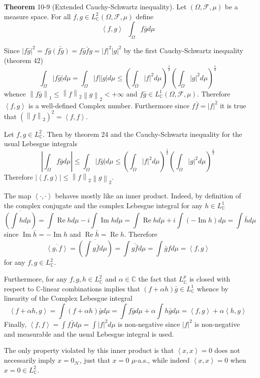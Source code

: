 \documentclass[a4paper]{article}
\newcommand{\brac}[1]{\left ( #1 \right )}
\newcommand{\abs}[1]{\left | #1 \right |}
\newcommand{\nrm}[1]{\left\| #1 \right \|}
\newcommand{\brkt}[1]{\left\langle #1 \right\rangle}
\newcommand{\Cplx}{\mathbb{C}}
\newcommand{\Hcal}{\mathcal{H}}
\newcommand{\Fcal}{\mathcal{F}}
\newcommand{\defn}{\mathop{\overset{\Delta}{=}}\nolimits}
\newcommand{\re}{\operatorname{Re}\nolimits}
\newcommand{\im}{\operatorname{Im}\nolimits}
\begin{document}
\label{thm:cauchy_schwartz_X} \noindent \textbf{Theorem} 10-9 (Extended Cauchy-Schwartz inequality).
Let $\brac{\Omega, \Fcal, \mu}$ be a measure space. For all $f,g\in L^2_\Cplx\brac{\Omega, \Fcal, \mu}$ define \[\brkt{f,g} \defn \int_\Omega f\bar{g} d\mu\]

Since $\abs{f\bar{g}}^2 = f\bar{g}\bar{\brac{f\bar{g}}} = f\bar{g} \bar{f} g = \abs{f}^2 \abs{g}^2$ by the first Cauchy-Schwartz inequality (theorem 42) \[\int_\Omega \abs{f\bar{g}} d\mu = \int_\Omega \abs{f}\abs{g} d\mu\leq \brac{\int_\Omega \abs{f}^2 d\mu}^\frac{1}{2} \brac{\int_\Omega \abs{g}^2 d\mu}^\frac{1}{2} \] whence $\nrm{f\bar{g}}_1\leq \nrm{f}_2 \nrm{g}_2 < +\infty$ and $f\bar{g}\in L^1_\Cplx\brac{\Omega, \Fcal, \mu}$. Therefore $\brkt{f,g}$ is a well-defined Complex number. Furthermore since $f\bar{f}=\abs{f}^2$ it is true that $\brac{\nrm{f}_2}^2 = \brkt{f,f}$.

Let $f,g\in L^2_\Cplx$. Then by theorem 24 and the Cauchy-Schwartz inequality for the usual Lebesgue integrals \[\abs{\int_\Omega f\bar{g} d\mu} \leq \int_\Omega \abs{f\bar{g}}d\mu\leq \brac{\int_\Omega \abs{f}^2 d\mu}^\frac{1}{2} \brac{\int_\Omega \abs{g}^2 d\mu}^\frac{1}{2}\] Therefore $\abs{\brkt{f,g}}\leq \nrm{f}_2 \nrm{g}_2$.

The map $\brkt{\cdot, \cdot}$ behaves mostly like an inner product. Indeed, by definition of the complex conjugate and the complex Lebesgue integral for any $h\in L^1_\Cplx$ \[\overline{\brac{\int h d\mu}} = \int \re h d\mu - i \int \im h d\mu = \int \re h d\mu + i \int \brac{-\im h} d\mu = \int \bar{h} d\mu\] since $\im \bar{h} = -\im h$ and $\re \bar{h} = \re h$. Therefore \[\overline{\brkt{g,f}} = \overline{\brac{\int g\bar{f} d\mu}} = \int \overline{g\bar{f}} d\mu = \int \bar{g}f d\mu = \brkt{f,g}\] for any $f,g\in L^2_\Cplx$.

Furthermore, for any $f,g,h\in L^2_\Cplx$ and $\alpha\in \Cplx$ the fact that $L^p_\Cplx$ is closed with respect to $\Cplx$-linear combinations implies that $\brac{f+\alpha h}\bar{g}\in L^1_\Cplx$ whence by linearity of the Complex Lebesgue integral \[\brkt{f+\alpha h,g} = \int \brac{f+\alpha h}\bar{g} d\mu = \int f\bar{g} d\mu +\alpha \int h\bar{g} d\mu = \brkt{f,g}+\alpha \brkt{h,g}\] Finally, $\brkt{f,f} = \int f\bar{f} d\mu = \int \abs{f}^2 d\mu$ is non-negative since $\abs{f}^2$ is non-negative and measurable and the usual Lebesgue integral is used.

The only property violated by this inner product is that $\brkt{x,x}=0$ does not necessarily imply $x=0_\Hcal$, just that $x=0$ $\mu$-a.s., while indeed $\brkt{x,x}=0$ when $x=0\in L^2_\Cplx$.
\end{document}
